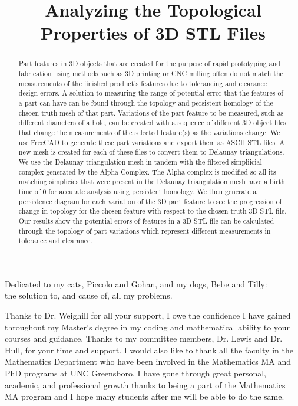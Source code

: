 \documentclass[ma]{uncgdissertationexp}
\title{Analyzing the Topological Properties of 3D STL Files}
\theoremstyle{plain}
\theoremstyle{definition}
\theoremstyle{remark}
\begin{document}
\frontmatter      %
\begin{abstract}
Part features in 3D objects that are created for the purpose of rapid prototyping and fabrication using methods such as 3D printing or CNC milling often do not match the measurements of the finished product's features due to tolerancing and clearance design errors. A solution to measuring the range of potential error that the features of a part can have can be found through the topology and persistent homology of the chsoen truth mesh of that part. Variations of the part feature to be measured, such as different diameters of a hole, can be created with a sequence of different 3D object files that change the measurements of the selected feature(s) as the variations change. We use FreeCAD to generate these part variations and export them as ASCII STL files. A new mesh is created for each of these files to convert them to Delaunay triangulations. We use the Delaunay triangulation mesh in tandem with the filtered simpliicial complex generated by the Alpha Complex. The Alpha complex is modified so all its matching simplicies that were present in the Delaunay triangulation mesh have a birth time of 0 for accurate analysis using persistent homology. We then generate a persistence diagram for each variation of the 3D part feature to see the progression of change in topology for the chosen feature with respect to the chosen truth 3D STL file. Our results show the potential errors of features in a 3D STL file can be calculated through the topology of part variations which represent different measurements in tolerance and clearance.
\end{abstract}
\maketitlepage  
\begin{dedication}
Dedicated to my cats, Piccolo and Gohan, and my dogs, Bebe and Tilly:\\
the solution to, and cause of, all my problems.
\end{dedication}
\makeapprovalpage
\begin{acknowledgments}
\par Thanks to Dr. Weighill for all your support, I owe the confidence I have gained throughout my Master's degree in my coding and mathematical ability to your courses and guidance. Thanks to my committee members, Dr. Lewis and Dr. Hull, for your time and support. I would also like to thank all the faculty in the Mathematics Department who have been involved in the Mathematics MA and PhD programs at UNC Greensboro. I have gone through great personal, academic, and professional growth thanks to being a part of the Mathematics MA program and I hope many students after me will be able to do the same.
\end{acknowledgments}
\tableofcontents
\listoffigures
\listoftables
\mainmatter
\end{document}
